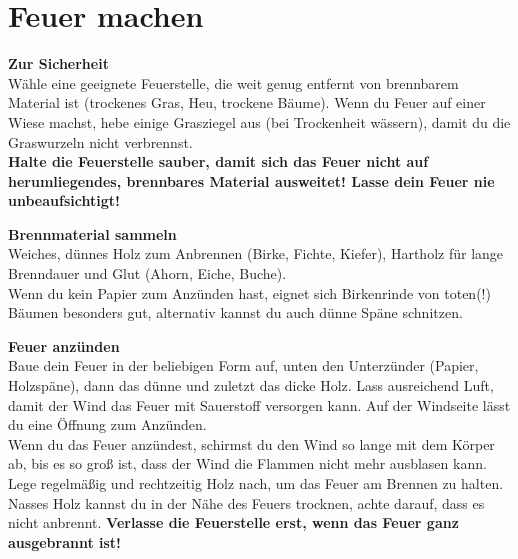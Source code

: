 \section*{Feuer machen}

\textbf{\Large Zur Sicherheit}\\
Wähle eine geeignete Feuerstelle, die weit genug entfernt von brennbarem Material ist (trockenes Gras, Heu, trockene Bäume).
Wenn du Feuer auf einer Wiese machst, hebe einige Grasziegel aus (bei Trockenheit wässern), damit du die Graswurzeln nicht verbrennst.\\
\textbf{Halte die Feuerstelle sauber, damit sich das Feuer nicht auf herumliegendes, brennbares Material ausweitet! Lasse dein Feuer nie unbeaufsichtigt!}

\textbf{\Large Brennmaterial sammeln}\\
Weiches, dünnes Holz zum Anbrennen (Birke, Fichte, Kiefer), Hartholz für lange Brenndauer und Glut (Ahorn, Eiche, Buche).\\
Wenn du kein Papier zum Anzünden hast, eignet sich Birkenrinde von toten(!) Bäumen besonders gut, alternativ kannst du auch dünne Späne schnitzen.

\textbf{\Large Feuer anzünden}\\
Baue dein Feuer in der beliebigen Form auf, unten den Unterzünder (Papier, Holzspäne), dann das dünne und zuletzt das dicke Holz.
Lass ausreichend Luft, damit der Wind das Feuer mit Sauerstoff versorgen kann.
Auf der Windseite lässt du eine Öffnung zum Anzünden.\\
Wenn du das Feuer anzündest, schirmst du den Wind so lange mit dem Körper ab, bis es so groß ist, dass der Wind die Flammen nicht mehr ausblasen kann.\\
Lege regelmäßig und rechtzeitig Holz nach, um das Feuer am Brennen zu halten.\\
Nasses Holz kannst du in der Nähe des Feuers trocknen, achte darauf, dass es nicht anbrennt.
\textbf{Verlasse die Feuerstelle erst, wenn das Feuer ganz ausgebrannt ist!}

